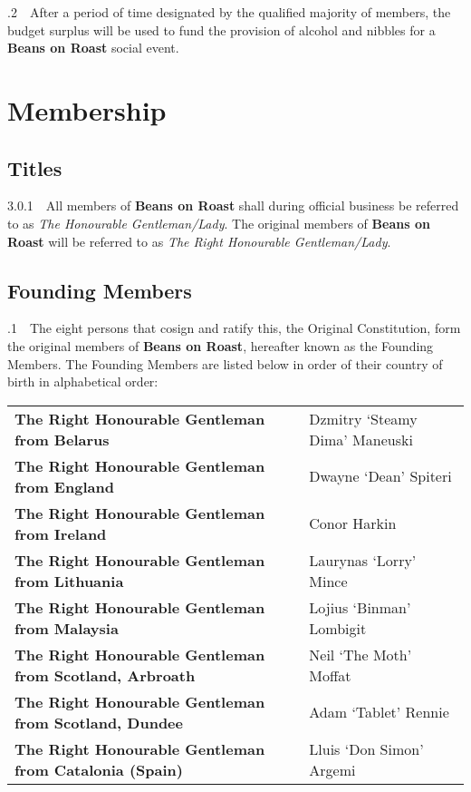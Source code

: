 \documentclass[a4paper,11pt]{article}
\begin{document}
.2$\quad$After a period of time designated by the qualified majority of members, the budget surplus will be used to fund the provision of alcohol and nibbles for a \textbf{Beans on Roast} social event.

\section{Membership}
\label{Membership}
\subsection{Titles}
\label{Titles}
3.0.1$\quad$All members of \textbf{Beans on Roast} shall during official business be referred to as \textit{The Honourable Gentleman/Lady}. The original members of \textbf{Beans on Roast} will be referred to as \textit{The Right Honourable Gentleman/Lady}.

\subsection{Founding Members}
\label{Founding Members}
.1$\quad$The eight persons that cosign and ratify this, the Original Constitution, form the original members of \textbf{Beans on Roast}, hereafter known as the Founding Members. The Founding Members are listed below in order of their country of birth in alphabetical order: 

\begin{table}[h!]
\begin{tabular}{ll}
\textbf{The Right Honourable Gentleman from Belarus} & Dzmitry `Steamy Dima'  Maneuski \\
\textbf{The Right Honourable Gentleman from England} & Dwayne `Dean' Spiteri \\
\textbf{The Right Honourable Gentleman from Ireland} & Conor Harkin \\
\textbf{The Right Honourable Gentleman from Lithuania} & Laurynas `Lorry' Mince \\
\textbf{The Right Honourable Gentleman from Malaysia} & Lojius `Binman' Lombigit \\
\textbf{The Right Honourable Gentleman from Scotland, Arbroath} & Neil `The Moth' Moffat \\
\textbf{The Right Honourable Gentleman from Scotland, Dundee} & Adam `Tablet' Rennie \\
\textbf{The Right Honourable Gentleman from Catalonia (Spain)} & Lluis `Don Simon' Argemi
\end{tabular}
\end{table}
\end{document}
